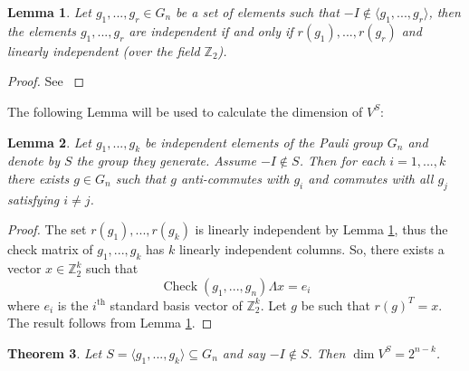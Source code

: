 \documentclass[12pt]{article}
\theoremstyle{plain}
\newtheorem{thm}{Theorem}[subsection] %
\newtheorem{lemma}[thm]{Lemma}
\theoremstyle{definition}
\newcommand{\bb}[1]{\mathbb{#1}}
\begin{document}
\begin{lemma}\label{lem:lin_indep}
	Let $g_1,...,g_r \in G_n$ be a set of elements such that $-I \not\in \langle g_1,...,g_r\rangle$, then the elements $g_1,...,g_r$ are independent if and only if $r(g_1),...,r(g_r)$ and linearly independent (over the field $\bb{Z}_2$).
\end{lemma}
\begin{proof}
	See \cite[Page 457, Proposition 10.3]{quantum_computing}
\end{proof}
The following Lemma will be used to calculate the dimension of $V^S$:
	\begin{lemma}\label{lem:anti_commutes}
		Let $g_1,...,g_k$ be independent elements of the Pauli group $G_n$ and denote by $S$ the group they generate. Assume $-I \not\in S$. Then for each $i = 1,...,k$ there exists $g \in G_n$ such that $g$ anti-commutes with $g_i$ and commutes with all $g_j$ satisfying $i \neq j$.
	\end{lemma}
	\begin{proof}
		The set $r(g_1),...,r(g_k)$ is linearly independent by Lemma \ref{lem:lin_indep}, thus the check matrix of $g_1,...,g_k$ has $k$ linearly independent columns. So, there exists a vector $x \in \bb{Z}_2^k$ such that
		\begin{equation}
			\operatorname{Check}(g_1,...,g_n)\Lambda x = e_i
		\end{equation}
		where $e_i$ is the $i^{\text{th}}$ standard basis vector of $\bb{Z}_2^k$. Let $g$ be such that $r(g)^T = x$. The result follows from Lemma \ref{lem:lin_indep}.
	\end{proof}
	\begin{thm}\label{thm:dimension_stabiliser}
		Let $S = \langle g_1,...,g_k\rangle \subseteq G_n$ and say $-I \not\in S$. Then $\operatorname{dim}V^S = 2^{n - k}$.
	\end{thm}
\end{document}
